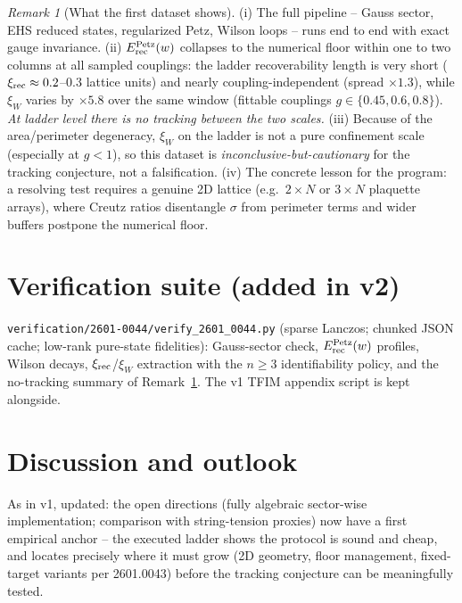 \documentclass[11pt]{article}
\theoremstyle{remark}
\newtheorem{remark}[definition]{Remark}
\newcommand{\Erec}{E^{\rm Petz}_{\rm rec}}
\begin{document}
\begin{remark}[What the first dataset shows]
\label{rem:z2findings}
(i) The full pipeline -- Gauss sector, EHS reduced states, regularized
Petz, Wilson loops -- runs end to end with exact gauge invariance.
(ii) $\Erec(w)$ collapses to the numerical floor within one to two
columns at all sampled couplings: the ladder recoverability length is
very short ($\xi_{\rm rec} \approx 0.2$--$0.3$ lattice units) and nearly
coupling-independent (spread $\times 1.3$), while $\xi_W$ varies by
$\times 5.8$ over the same window (fittable couplings $g \in \{0.45, 0.6, 0.8\}$). \emph{At ladder level there is no
tracking between the two scales.} (iii) Because of the area/perimeter
degeneracy, $\xi_W$ on the ladder is not a pure confinement scale
(especially at $g < 1$), so this dataset is
\emph{inconclusive-but-cautionary} for the tracking conjecture, not a
falsification. (iv) The concrete lesson for the program: a resolving
test requires a genuine 2D lattice (e.g.\ $2 \times N$ or $3 \times N$
plaquette arrays), where Creutz ratios disentangle $\sigma$ from
perimeter terms and wider buffers postpone the numerical floor.
\end{remark}

\section{Verification suite (added in v2)}
\texttt{verification/2601-0044/verify\_2601\_0044.py} (sparse Lanczos;
chunked JSON cache; low-rank pure-state fidelities): Gauss-sector check,
$\Erec(w)$ profiles, Wilson decays, $\xi_{\rm rec}$/$\xi_W$ extraction
with the $n \ge 3$ identifiability policy, and the no-tracking summary of
Remark~\ref{rem:z2findings}. The v1 TFIM appendix script is kept
alongside.

\section{Discussion and outlook}
As in v1, updated: the open directions (fully algebraic sector-wise
implementation; comparison with string-tension proxies) now have a first
empirical anchor -- the executed ladder shows the protocol is sound and
cheap, and locates precisely where it must grow (2D geometry, floor
management, fixed-target variants per 2601.0043) before the tracking
conjecture can be meaningfully tested.
\end{document}

